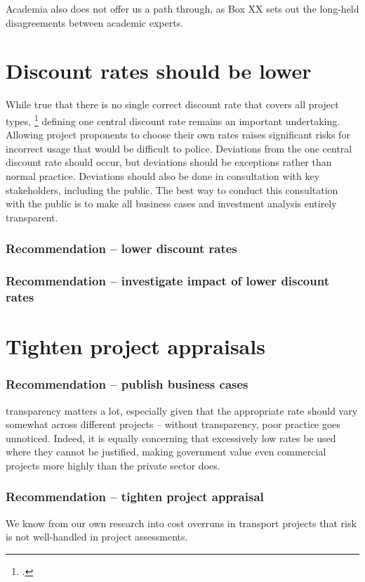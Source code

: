 Academia also does not offer us a path through, as Box XX sets out the long-held disagreements between academic experts. 




\section{Discount rates should be lower}
While true that there is no single correct discount rate that covers all project types,%
    \footcite[][1]{Grimes-Beyond-Simple-CBA}
defining one central discount rate remains an important undertaking. Allowing project proponents to choose their own rates raises significant risks for incorrect usage that would be difficult to police. Deviations from the one central discount rate should occur, but deviations should be exceptions rather than normal practice. Deviations should also be done in consultation with key stakeholders, including the public. The best way to conduct this consultation with the public is to make all business cases and investment analysis entirely transparent. 



\subsubsection{Recommendation -- lower discount rates}

\subsubsection{Recommendation -- investigate impact of lower discount rates}


\section{Tighten project appraisals}

\subsubsection{Recommendation -- publish business cases}
transparency matters a lot, especially given that the appropriate rate should vary somewhat across different projects – without transparency, poor practice goes unnoticed.
Indeed, it is equally concerning that excessively low rates be used where they cannot be justified, making government value even commercial projects more highly than the private sector does. 

\subsubsection{Recommendation -- tighten project appraisal}
We know from our own research into cost overruns in transport projects that risk is not well-handled in project assessments.

